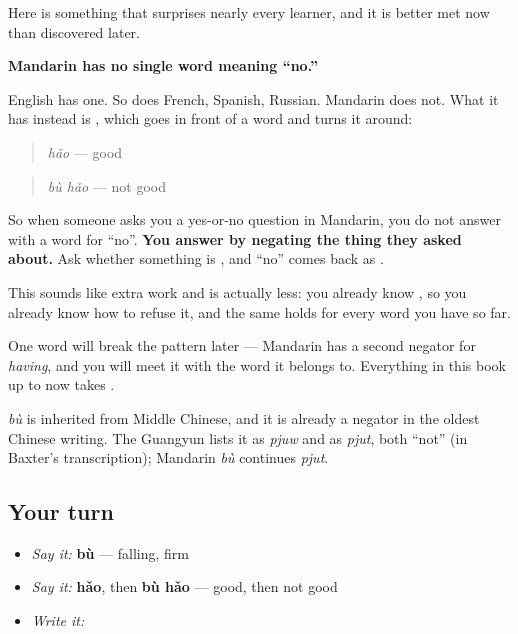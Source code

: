 \begin{grammarlens}[title={Grammar Lens: there is no word for \textquotedblleft{}no\textquotedblright{}}]
Here is something that surprises nearly every learner, and it is better met now than discovered later.

\textbf{Mandarin has no single word meaning \textquotedblleft{}no.\textquotedblright{}}

English has one. So does French, Spanish, Russian. Mandarin does not. What it has instead is \textbf{}, which goes in front of a word and turns it around:

\begin{quote}
 \emph{hǎo} — good
\end{quote}

\begin{quote}
 \emph{bù hǎo} — not good
\end{quote}

So when someone asks you a yes-or-no question in Mandarin, you do not answer with a word for \textquotedblleft{}no\textquotedblright{}. \textbf{You answer by negating the thing they asked about.} Ask whether something is , and \textquotedblleft{}no\textquotedblright{} comes back as .

This sounds like extra work and is actually less: you already know , so you already know how to refuse it, and the same holds for every word you have so far.

One word will break the pattern later — Mandarin has a second negator for \emph{having}, and you will meet it with the word it belongs to. Everything in this book up to now takes .
\end{grammarlens}

\begin{cousinweb}
\textbf{} \emph{bù} is inherited from Middle Chinese, and it is already a negator in the oldest Chinese writing. The Guangyun lists it as \emph{pjuw} and as \emph{pjut}, both \textquotedblleft{}not\textquotedblright{} (in Baxter's transcription); Mandarin \emph{bù} continues \emph{pjut}.
\end{cousinweb}

\subsection*{Your turn}
\begin{itemize}
\raggedright
  \item \emph{Say it:} \textbf{bù} — falling, firm
  \item \emph{Say it:} \textbf{hǎo}, then \textbf{bù hǎo} — good, then not good
  \item \emph{Write it:} 
\end{itemize}

